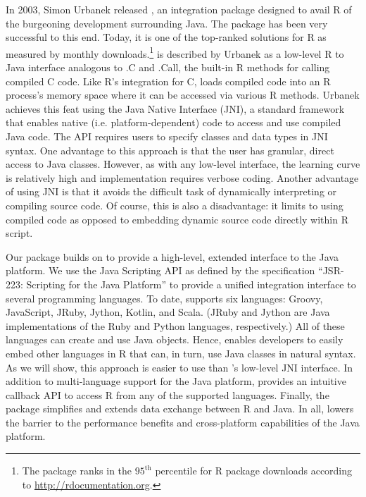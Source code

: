 In 2003, Simon Urbanek released , an integration package designed to avail R of the burgeoning development surrounding Java. The package has been very successful to this end. Today, it is one of the top-ranked solutions for R as measured by monthly downloads.\footnote{The  package ranks in the $95^{\text{th}}$ percentile for R package downloads according to \href{http://rdocumentation.org}{http://rdocumentation.org}.}  is described by Urbanek as a low-level R to Java interface analogous to .C and .Call, the built-in R methods for calling compiled C code. Like R's integration for C,  loads compiled code into an R process's memory space where it can be accessed via various R methods. Urbanek achieves this feat using the Java Native Interface (JNI), a standard framework that enables native (i.e. platform-dependent) code to access and use compiled Java code. The  API requires users to specify classes and data types in JNI syntax. One advantage to this approach is that the user has granular, direct access to Java classes. However, as with any low-level interface, the learning curve is relatively high and implementation requires verbose coding. Another advantage of using JNI is that it avoids the difficult task of dynamically interpreting or compiling source code. Of course, this is also a disadvantage: it limits  to using compiled code as opposed to embedding dynamic source code directly within R script.

Our  package builds on  to provide a high-level, extended interface to the Java platform. We use the Java Scripting API \citep{jsa} as defined by the specification “JSR-223: Scripting for the Java Platform” \citep{jsr223spec} to provide a unified integration interface to several programming languages. To date,  supports six languages: Groovy, JavaScript, JRuby, Jython, Kotlin, and Scala. (JRuby and Jython are Java implementations of the Ruby and Python languages, respectively.) All of these languages can create and use Java objects. Hence,  enables developers to easily embed other languages in R that can, in turn, use Java classes in natural syntax. As we will show, this approach is easier to use than 's low-level JNI interface. In addition to multi-language support for the Java platform,  provides an intuitive callback API to access R from any of the supported languages. Finally, the  package simplifies and extends data exchange between R and Java. In all,  lowers the barrier to the performance benefits and cross-platform capabilities of the Java platform.

